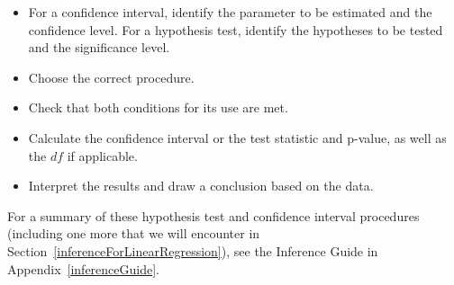 \begin{itemize}\vspace{-1mm}
\setlength{\itemsep}{0mm}
\item For a confidence interval, identify the parameter to be estimated and the confidence level.  For a hypothesis test, identify the hypotheses to be tested and the significance level.
\item Choose the correct procedure.
\item Check that both conditions for its use are met.
\item Calculate the confidence interval or the test statistic and p-value, as well as the $df$ if applicable.
\item Interpret the results and draw a conclusion based on the data.
\end{itemize}
For a summary of these hypothesis test and confidence interval procedures (including one more that we will encounter in Section~\ref{inferenceForLinearRegression}), see the Inference Guide in Appendix~\ref{inferenceGuide}.



